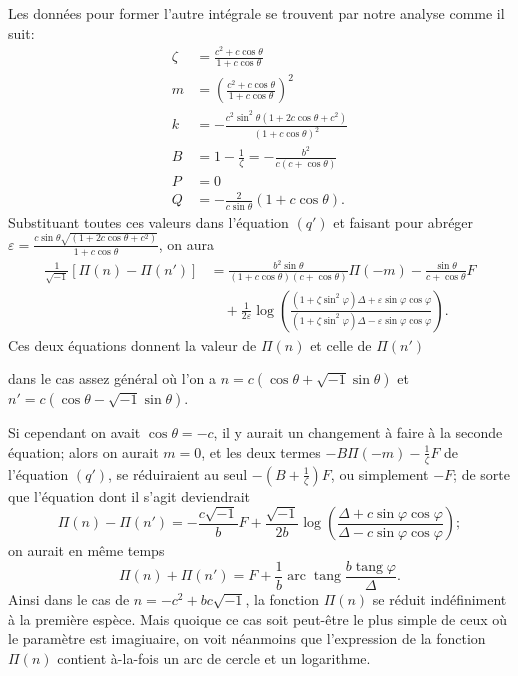 \documentclass{article}
\begin{document}
Les données pour former l'autre intégrale se trouvent par notre analyse comme il suit:
\[ \begin{aligned} \zeta&=\frac{c^{2}+c\cos\theta}{1+c\cos\theta}\\ m&=\left(\frac{c^{2}+c\cos\theta}{1+c\cos\theta}\right)^{2}\\ k&=-\frac{c^{2}\sin^{2}\theta(1+2c\cos\theta+c^{2})}{(1+c\cos\theta)^{2}}\\ B&=1-\frac{1}{\zeta}=-\frac{b^{2}}{c(c+\cos\theta)}\\ P&=0\\ Q&=-\frac{2}{c\sin\theta}(1+c\cos\theta). \end{aligned} \]
Substituant toutes ces valeurs dans l'équation $(q')$ et faisant pour abréger $\varepsilon=\frac{c\sin\theta\sqrt{(1+2c\cos\theta+c^{2})}}{1+c\cos\theta}$, on aura
\[ \begin{aligned} \frac{1}{\sqrt{-1}}[\Pi(n)-\Pi(n')]&=\frac{b^{2}\sin\theta}{(1+c\cos\theta)(c+\cos\theta)}\Pi(-m)-\frac{\sin\theta}{c+\cos\theta}F\\ &\quad+\frac{1}{2\varepsilon}\log\left(\frac{(1+\zeta\sin^{2}\varphi)\Delta+\varepsilon\sin\varphi\cos\varphi}{(1+\zeta\sin^{2}\varphi)\Delta-\varepsilon\sin\varphi\cos\varphi}\right). \end{aligned} \]
Ces deux équations donnent la valeur de $\Pi(n)$ et celle de $\Pi(n')$

dans le cas assez général où l'on a $n=c(\cos\theta+\sqrt{-1}\sin\theta)$ et $n'=c(\cos\theta-\sqrt{-1}\sin\theta)$.

Si cependant on avait $\cos\theta=-c$, il y aurait un changement à faire à la seconde équation; alors on aurait $m=0$, et les deux termes $-B\Pi(-m)-\frac{1}{\zeta}F$ de l'équation $(q')$, se réduiraient au seul $-\left(B+\frac{1}{\zeta}\right)F$, ou simplement $-F$; de sorte que l'équation dont il s'agit deviendrait
\[ \Pi(n)-\Pi(n')=-\frac{c\sqrt{-1}}{b}F+\frac{\sqrt{-1}}{2b}\log\left(\frac{\Delta+c\sin\varphi\cos\varphi}{\Delta-c\sin\varphi\cos\varphi}\right); \]
on aurait en même temps
\[ \Pi(n)+\Pi(n')=F+\frac{1}{b}\operatorname{arc}\operatorname{tang}\frac{b\operatorname{tang}\varphi}{\Delta}. \]
Ainsi dans le cas de $n=-c^{2}+bc\sqrt{-1}$, la fonction $\Pi(n)$ se réduit indéfiniment à la première espèce. Mais quoique ce cas soit peut-être le plus simple de ceux où le paramètre est imagiuaire, on voit néanmoins que l'expression de la fonction $\Pi(n)$ contient à-la-fois un arc de cercle et un logarithme.
\end{document}
